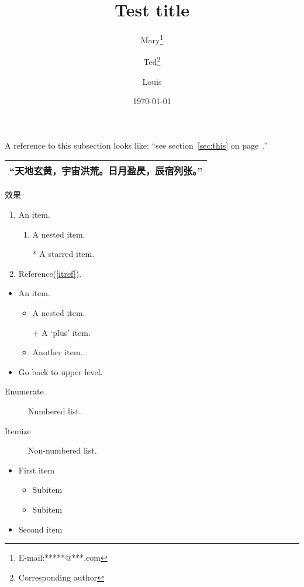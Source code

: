 \documentclass{ctexart}
\title{Test title}
\author{ Mary\thanks{E-mail:*****@***.com}
\and Ted\thanks{Corresponding author}
\and Louis}
\date{\today}
\begin{document}
\maketitle

A reference to this subsection
\label{sec:this} looks like:
``see section~\ref{sec:this} on
page~\pageref{sec:this}.''

\begin{tabular}{l}
\hline
“天地玄黄，宇宙洪荒。日月盈昃，辰宿列张。”\footnotemark \\
\hline
\end{tabular}
效果


\begin{enumerate}
\item An item.
\begin{enumerate}
\item A nested item.\label{itref}
\item[*] A starred item.
\end{enumerate}
\item Reference(\ref{itref}).
\end{enumerate}

\begin{itemize}
    \item An item.
    \begin{itemize}
    \item A nested item.
    \item[+] A `plus' item.
    \item Another item.
    \end{itemize}
    \item Go back to upper level.
\end{itemize}

\begin{description}
    \item[Enumerate] Numbered list.
    \item[Itemize] Non-numbered list.
\end{description}

\renewcommand{\labelitemi}{\ddag}
\renewcommand{\labelitemii}{\dag}
\begin{itemize}
\item First item
\begin{itemize}
\item Subitem
\item Subitem
\end{itemize}
\item Second item
\end{itemize}
\end{document}
